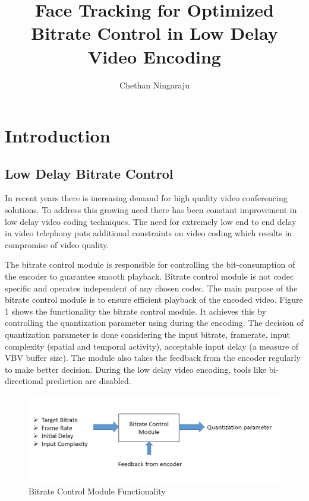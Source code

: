 \documentclass[11pt]{article} %
\title{Face Tracking for Optimized Bitrate Control in Low Delay Video Encoding}
\author{Chethan Ningaraju}
\begin{document}
\maketitle
\clearpage
\tableofcontents
\clearpage
\section{Introduction}
  \subsection{Low Delay Bitrate Control}
	In recent years there is increasing demand for high quality video conferencing solutions. To address this growing need there has been constant improvement in  low delay video coding techniques. The need for extremely low end to end delay in video telephony puts additional constraints on video coding which results in compromise of video quality.

	The bitrate control module is responsible for controlling the bit-consumption of the encoder to guarantee smooth playback. Bitrate control module is not codec specific and operates independent of any chosen codec. The main purpose of the bitrate control module is to ensure efficient playback of the encoded video. Figure 1 shows the functionality the bitrate control module. It achieves this by controlling the quantization parameter using during the encoding. The decision of quantization parameter is done considering the input bitrate, framerate, input complexity (spatial and temporal activity), acceptable input delay (a measure of VBV buffer size). The module also takes the feedback from the encoder regularly to make better decision.  During the low delay video encoding, tools like bi-directional  	prediction are disabled.

\begin{figure}[h]
    \centering
    \includegraphics[scale=0.5]{RC_block}
    \caption{Bitrate Control Module Functionality}
    \label{fig:Bitrate Control Module Functionality}
\end{figure} 
\end{document}
